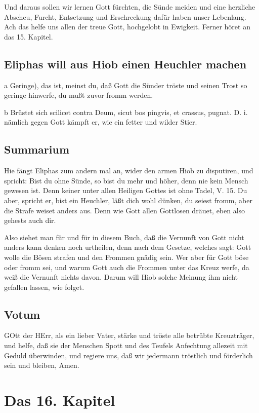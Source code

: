 Und daraus sollen wir lernen Gott fürchten, die Sünde meiden und eine herzliche Abscheu, Furcht, Entsetzung und Erschreckung dafür haben unser Lebenlang. Ach das helfe uns allen der treue Gott, hochgelobt in Ewigkeit. Ferner höret an das 15. Kapitel.

\section{Eliphas will aus Hiob einen Heuchler machen}

a Geringe), das ist, meinst du, daß Gott die Sünder tröste und seinen Trost so geringe hinwerfe, du mußt zuvor fromm werden.

b Brüstet sich scilicet contra Deum, sicut bos pingvis, et crassus, pugnat. D. i. nämlich gegen Gott kämpft er, wie ein fetter und wilder Stier.

\section{Summarium}

Hie fängt Eliphas zum andern mal an, wider den armen Hiob zu disputiren, und spricht: Bist du ohne Sünde, so bist du mehr und höher, denn nie kein Mensch gewesen ist. Denn keiner unter allen Heiligen Gottes ist ohne Tadel, V. 15. Du aber, spricht er, bist ein Heuchler, läßt dich wohl dünken, du seiest fromm, aber die Strafe weiset anders aus. Denn wie Gott allen Gottlosen dräuet, eben also gehests auch dir.

Also siehet man für und für in diesem Buch, daß die Vernunft von Gott nicht anders kann denken noch urtheilen, denn nach dem Gesetze, welches sagt: Gott wolle die Bösen strafen und den Frommen gnädig sein. Wer aber für Gott böse oder fromm sei, und warum Gott auch die Frommen unter das Kreuz werfe, da weiß die Vernunft nichts davon. Darum will Hiob solche Meinung ihm nicht gefallen lassen, wie folget.

\section{Votum}

GOtt der HErr, als ein lieber Vater, stärke und tröste alle betrübte Kreuzträger, und helfe, daß sie der Menschen Spott und des Teufels Anfechtung allezeit mit Geduld überwinden, und regiere uns, daß wir jedermann tröstlich und förderlich sein und bleiben, Amen.

\chapter{Das 16. Kapitel}

